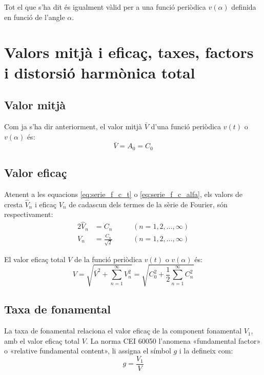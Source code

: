 Tot el que s'ha dit és igualment vàlid per a una funció periòdica
$v(\alpha)$  definida en funció de l'angle $\alpha$.


\section{Valors mitjà i eficaç, taxes, factors i distorsió harmònica total}\label{sec:four_val_mitja_ef}

\subsection{Valor mitjà}\label{sec:four_val_av}

Com ja s'ha dir anteriorment, el valor mitjà $\bar{V}$ d'una
funció periòdica $v(t)$ o $v(\alpha)$ és:
\begin{equation}
    \bar{V} = A_0 = C_0\label{eq:fourier_ave}
\end{equation}

\subsection{Valor eficaç}\label{sec:four_val_ef}

Atenent a les equacions  \eqref{eq:serie_f_c_t} o
\eqref{eq:serie_f_c_alfa}, els valors de cresta $\hat{V}_n$ i eficaç
$V_n$ de cadascun dels termes de la sèrie de Fourier, són respectivament:
\begin{alignat}{2}
    \hat{V}_n &= C_n &\qquad(n=1,2,\ldots,\infty)\\[0.5ex]
    V_n &= \frac{C_n}{\sqrt{2}} &\qquad(n=1,2,\ldots,\infty)\label{eq:fourier_efi}
\end{alignat}

El valor eficaç total $V$ de  la funció periòdica $v(t)$ o
$v(\alpha)$ és:
\begin{equation}
    V = \sqrt{\bar{V}^2 + \sum_{n=1}^{\infty}V^2_n} =
     \sqrt{C^2_0 + \frac{1}{2} \sum_{n=1}^{\infty}C^2_n}
     \label{eq:val_ef_fourier}
\end{equation}

\subsection{Taxa de fonamental}
La taxa  de fonamental relaciona el valor eficaç de la component fonamental $V_1$, amb el valor eficaç
total $V$. La norma CEI 60050 l'anomena «fundamental factor» o «relative fundamental content», li assigna el símbol $g$ i la defineix com:
\begin{equation}
    g = \frac{V_1}{V}
\end{equation}

